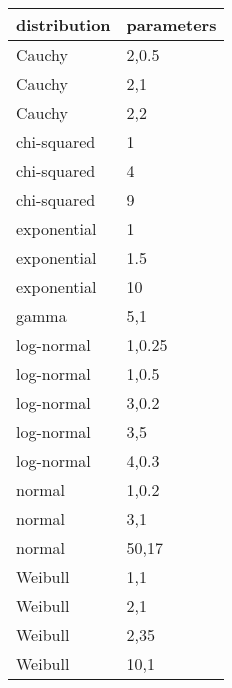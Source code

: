 \documentclass[border=1mm, preview]{standalone}
\begin{document}
\begin{tabular}{ll}
\toprule
distribution & parameters\\
\midrule
Cauchy & 2,0.5\\
Cauchy & 2,1\\
Cauchy & 2,2\\
chi-squared & 1\\
chi-squared & 4\\
\addlinespace
chi-squared & 9\\
exponential & 1\\
exponential & 1.5\\
exponential & 10\\
gamma & 5,1\\
\addlinespace
log-normal & 1,0.25\\
log-normal & 1,0.5\\
log-normal & 3,0.2\\
log-normal & 3,5\\
log-normal & 4,0.3\\
\addlinespace
normal & 1,0.2\\
normal & 3,1\\
normal & 50,17\\
Weibull & 1,1\\
Weibull & 2,1\\
\addlinespace
Weibull & 2,35\\
Weibull & 10,1\\
\bottomrule
\end{tabular}
\end{document}

